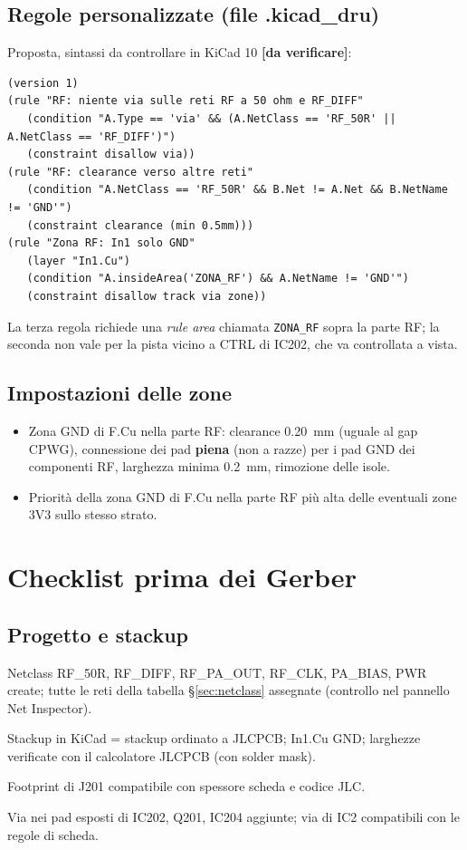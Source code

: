 \documentclass[a4paper,10pt]{article}
\newcommand{\net}[1]{\texttt{\detokenize{#1}}}
\newcommand{\dv}{\textcolor{verfr}{\textbf{[da verificare]}}}
\newcounter{regola}
\begin{document}
\subsection{Regole personalizzate (file .kicad\_dru)}
Proposta, sintassi da controllare in KiCad 10 \dv:
\begingroup\small
\begin{verbatim}
(version 1)
(rule "RF: niente via sulle reti RF a 50 ohm e RF_DIFF"
   (condition "A.Type == 'via' && (A.NetClass == 'RF_50R' || A.NetClass == 'RF_DIFF')")
   (constraint disallow via))
(rule "RF: clearance verso altre reti"
   (condition "A.NetClass == 'RF_50R' && B.Net != A.Net && B.NetName != 'GND'")
   (constraint clearance (min 0.5mm)))
(rule "Zona RF: In1 solo GND"
   (layer "In1.Cu")
   (condition "A.insideArea('ZONA_RF') && A.NetName != 'GND'")
   (constraint disallow track via zone))
\end{verbatim}
\endgroup
La terza regola richiede una \emph{rule area} chiamata \texttt{ZONA\_RF} sopra la parte RF; la seconda
non vale per la pista \net{EN_TX_ANT_SW} vicino a CTRL di IC202, che va controllata a vista.

\subsection{Impostazioni delle zone}
\begin{itemize}
\item Zona GND di F.Cu nella parte RF: clearance \SI{0.20}{mm} (uguale al gap CPWG), connessione dei pad
      \textbf{piena} (non a razze) per i pad GND dei componenti RF, larghezza minima \SI{0.2}{mm},
      rimozione delle isole.
\item Priorità della zona GND di F.Cu nella parte RF più alta delle eventuali zone 3V3 sullo stesso strato.
\end{itemize}

\section{Checklist prima dei Gerber}
\label{sec:checklist}
\subsection*{Progetto e stackup}
\begin{checklist}
\item Netclass RF\_50R, RF\_DIFF, RF\_PA\_OUT, RF\_CLK, PA\_BIAS, PWR create; tutte le reti della tabella
      \S\ref{sec:netclass} assegnate (controllo nel pannello Net Inspector).
\item Stackup in KiCad = stackup ordinato a JLCPCB; In1.Cu GND; larghezze verificate con il calcolatore
      JLCPCB (con solder mask).
\item Footprint di J201 compatibile con spessore scheda e codice JLC.
\item Via nei pad esposti di IC202, Q201, IC204 aggiunte; via di IC2 compatibili con le regole di scheda.
\end{checklist}
\end{document}
